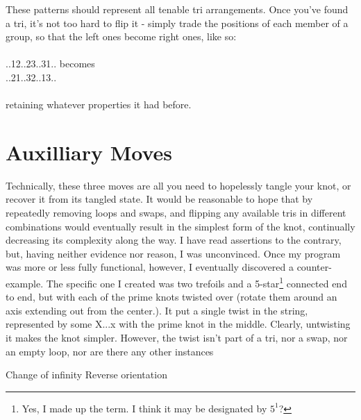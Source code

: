 \documentclass[twoside]{report}
\begin{document}
These patterns should represent all tenable tri arrangements.  Once you've found a tri, it's not too hard to flip it - simply trade the positions of each member of a group, so that the left ones become right ones, like so:\\\\
..12..23..31.. becomes\\
..21..32..13..\\\\
retaining whatever properties it had before.

\section{Auxilliary Moves}
Technically, these three moves are all you need to hopelessly tangle your knot, or recover it from its tangled state.  It would be reasonable to hope that by repeatedly removing loops and swaps, and flipping any available tris in different combinations would eventually result in the simplest form of the knot, continually decreasing its complexity along the way.  I have read assertions to the contrary, but, having neither evidence nor reason, I was unconvinced.  Once my program was more or less fully functional, however, I eventually discovered a counter-example.  The specific one I created was two trefoils and a 5-star\footnote{Yes, I made up the term.  I think it may be designated by $5^1$?} connected end to end, but with each of the prime knots twisted over (rotate them around an axis extending out from the center.).  It put a single twist in the string, represented by some X...x with the prime knot in the middle.  Clearly, untwisting it makes the knot simpler.  However, the twist isn't part of a tri, nor a swap, nor an empty loop, nor are there any other instances 

Change of infinity
Reverse orientation
\end{document}
